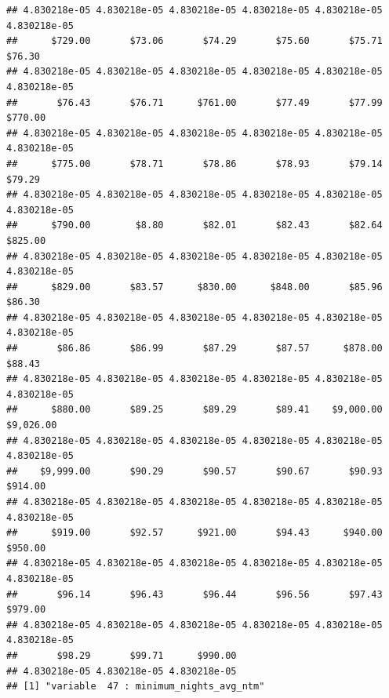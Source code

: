 \begin{verbatim}
## 4.830218e-05 4.830218e-05 4.830218e-05 4.830218e-05 4.830218e-05 4.830218e-05 
##      $729.00       $73.06       $74.29       $75.60       $75.71       $76.30 
## 4.830218e-05 4.830218e-05 4.830218e-05 4.830218e-05 4.830218e-05 4.830218e-05 
##       $76.43       $76.71      $761.00       $77.49       $77.99      $770.00 
## 4.830218e-05 4.830218e-05 4.830218e-05 4.830218e-05 4.830218e-05 4.830218e-05 
##      $775.00       $78.71       $78.86       $78.93       $79.14       $79.29 
## 4.830218e-05 4.830218e-05 4.830218e-05 4.830218e-05 4.830218e-05 4.830218e-05 
##      $790.00        $8.80       $82.01       $82.43       $82.64      $825.00 
## 4.830218e-05 4.830218e-05 4.830218e-05 4.830218e-05 4.830218e-05 4.830218e-05 
##      $829.00       $83.57      $830.00      $848.00       $85.96       $86.30 
## 4.830218e-05 4.830218e-05 4.830218e-05 4.830218e-05 4.830218e-05 4.830218e-05 
##       $86.86       $86.99       $87.29       $87.57      $878.00       $88.43 
## 4.830218e-05 4.830218e-05 4.830218e-05 4.830218e-05 4.830218e-05 4.830218e-05 
##      $880.00       $89.25       $89.29       $89.41    $9,000.00    $9,026.00 
## 4.830218e-05 4.830218e-05 4.830218e-05 4.830218e-05 4.830218e-05 4.830218e-05 
##    $9,999.00       $90.29       $90.57       $90.67       $90.93      $914.00 
## 4.830218e-05 4.830218e-05 4.830218e-05 4.830218e-05 4.830218e-05 4.830218e-05 
##      $919.00       $92.57      $921.00       $94.43      $940.00      $950.00 
## 4.830218e-05 4.830218e-05 4.830218e-05 4.830218e-05 4.830218e-05 4.830218e-05 
##       $96.14       $96.43       $96.44       $96.56       $97.43      $979.00 
## 4.830218e-05 4.830218e-05 4.830218e-05 4.830218e-05 4.830218e-05 4.830218e-05 
##       $98.29       $99.71      $990.00 
## 4.830218e-05 4.830218e-05 4.830218e-05 
## [1] "variable  47 : minimum_nights_avg_ntm"
\end{verbatim}

